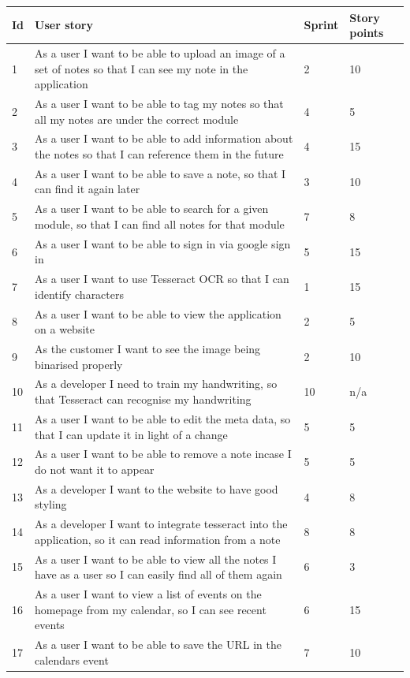 \begin{table}[h!]
\centering
\begin{tabular}{||p{1cm} p{10cm} p{1cm} p{1cm}||}
   \hline
 Id & User story & Sprint & Story points \\ [0.5ex]
 \hline\hline
 1 & As a user I want to be able to upload an image of a set of notes so that I can see my note in the application & 2	& 10 \\
 2 & As a user I want to be able to tag my notes so that  all my notes are under the correct module	& 4	 & 5 \\
 3&As a user I want to be able to add information about the notes so that I can reference them in the future&4&15 \\
 4&As a user I want to be able to save a note, so that I can find it again later&3&10 \\
 5&As a user I want to be able to search for a given module, so that I can find all notes for that module&7&8 \\
 6&As a user I want to be able to sign in via google sign in&5&15 \\
 7&As a user I want to use Tesseract OCR so that I can identify characters&1&15 \\
 8&As a user I want to be able to view the application on a website&2&5 \\
 9&As the customer I want to see the image being binarised properly&2&10 \\
 10&As a developer I need to train my handwriting, so that Tesseract can recognise my handwriting&10&n/a \\
 11&As a user I want to be able to edit the meta data, so that I can update it in light of a change&5&5 \\
 12&As a user I want to be able to remove a note incase I do not want it to appear&5&5 \\
 13&As a developer I want to the website to have good styling&4&8 \\
 14&As a developer I want to integrate tesseract into the application, so it can read information from a note&8&8 \\
 15&As a user I want to be able to view all the notes I have as a user so I can easily find all of them again&6&3 \\
 16&As a user I want to view a list of events on the homepage from my calendar, so I can see recent events&6&15 \\
 17&As a user I want to be able to save the URL in the calendars event&7&10 \\

\end{tabular}
\end{table}
